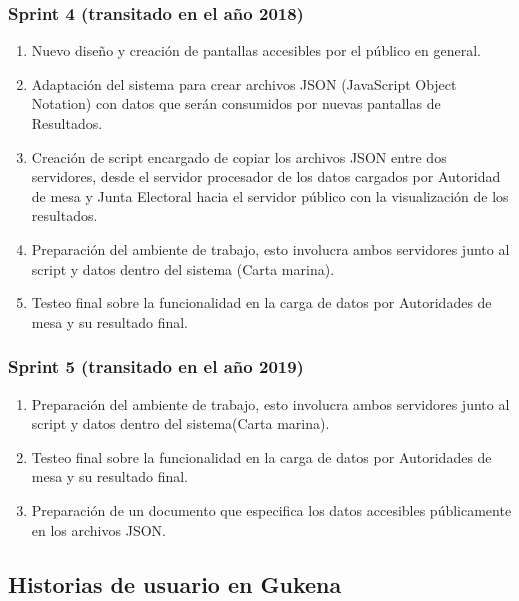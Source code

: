 \subsubsection{Sprint 4 (transitado en el año 2018)}
\begin{enumerate}
    \item Nuevo diseño y creación de pantallas accesibles por el público en general.
    \item Adaptación del sistema para crear archivos JSON (JavaScript Object Notation) con datos que serán consumidos por nuevas pantallas de Resultados.
    \item Creación de script encargado de copiar los archivos JSON entre dos servidores, desde el servidor procesador de los datos cargados por Autoridad de mesa y Junta Electoral hacia el servidor público con la visualización de los resultados.
    \item Preparación del ambiente de trabajo, esto involucra ambos servidores junto al script y datos dentro del sistema (Carta marina).
    \item Testeo final sobre la funcionalidad en la carga de datos por Autoridades de mesa y su resultado final.
\end{enumerate}
\subsubsection{Sprint 5 (transitado en el año 2019)}
\begin{enumerate}
    \item Preparación del ambiente de trabajo, esto involucra ambos servidores junto al script y datos dentro del sistema(Carta marina).
    \item Testeo final sobre la funcionalidad en la carga de datos por Autoridades de mesa y su resultado final.
    \item Preparación de un documento que especifica los datos accesibles públicamente en los archivos JSON.
\end{enumerate}

\subsection{Historias de usuario en Gukena}

